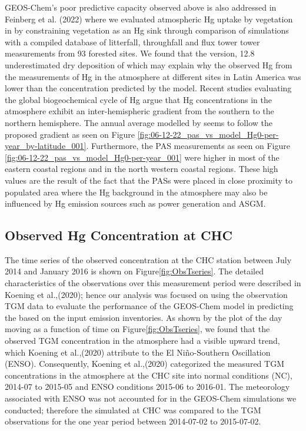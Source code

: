 \begin{flushleft}
GEOS-Chem's poor predictive capacity observed above is also addressed in Feinberg et al. (2022) where we evaluated atmospheric Hg uptake by vegetation in \gc by constraining vegetation as an Hg sink through comparison of simulations with a compiled database of litterfall, throughfall and flux tower tower measurements from 93 forested sites. We found that the \gc version, 12.8  underestimated dry deposition of \hg which may explain why the observed Hg from the measurements of Hg in the atmosphere at different sites in Latin America was lower than the concentration predicted by the model. Recent studies evaluating the global biogeochemical cycle of Hg argue that Hg concentrations in the atmosphere exhibit an inter-hemispheric gradient from the southern to the northern hemisphere. The annual average \hg modelled by \gc seems to follow the proposed gradient as seen on Figure \ref{fig:06-12-22_pas_vs_model_Hg0-per-year_by-latitude_001}. Furthermore, the PAS measurements as seen on Figure \ref{fig:06-12-22_pas_vs_model_Hg0-per-year_001} were higher in most of the eastern coastal regions and in the north western coastal regions. These high values are the result of the fact that the PASs were placed in close proximity to populated area where the Hg background in the atmosphere may also be influenced by Hg emission sources such as power generation and ASGM.

\end{flushleft}





\subsection{Observed Hg Concentration at CHC}
\begin{flushleft}
The time series of the observed concentration at the CHC station between July 2014 and January 2016 is shown on Figure\ref{fig:ObsTseries}. The detailed characteristics of the observations over this measurement period were described in Koening et al.,(2020); hence our analysis was focused on using the observation TGM data to evaluate the performance of the GEOS-Chem model in predicting the \hg based on the input \hg emission inventories. As shown by the plot of the  day moving as a function of time on Figure\ref{fig:ObsTseries}, we found that the observed TGM concentration in the atmosphere had a visible upward trend, which Koening et al.,(2020) attribute to the El Niño-Southern Oscillation (ENSO). Consequently, Koening et al.,(2020) categorized the measured TGM concentrations in the atmosphere at the CHC site into normal conditions (NC), 2014-07 to 2015-05 and ENSO conditions  2015-06 to 2016-01. The meteorology associated with ENSO was not accounted for in the GEOS-Chem \hg simulations we conducted; therefore the simulated \hg  at CHC was compared to the TGM observations for the one year period between 2014-07-02 to 2015-07-02.
\end{flushleft}

